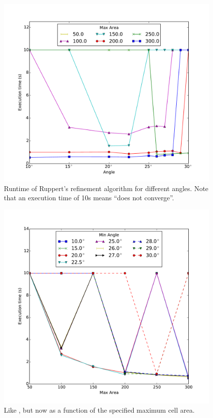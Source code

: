 \begin{figure}[ht]
    \centering
    \includegraphics[width=\columnwidth]{../images/ruppert.pdf}
    \caption{Runtime of Ruppert's refinement algorithm for different angles. Note that an execution time of 10s means ``does not converge''.}
    \label{fig:ruppert-runtime}
\end{figure}

\begin{figure}[ht]
    \centering
    \includegraphics[width=\columnwidth]{../images/ruppert2.pdf}
    \caption{Like , but now as a function of the specified maximum cell area.}
    \label{fig:ruppert-runtime2}
\end{figure}

